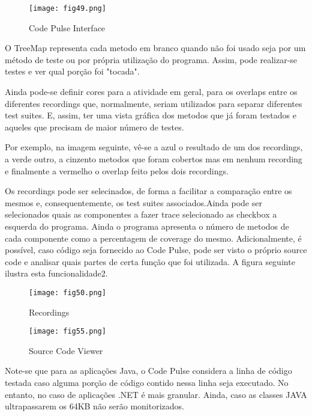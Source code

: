 \begin{figure}[H]

  \centering

  \texttt{[image: fig49.png]}

  \caption{Code Pulse Interface}

\end{figure}

O TreeMap representa cada metodo em branco quando não foi usado seja por um método de teste ou por própria utilização do programa. Assim, pode realizar-se testes e ver qual porção foi "tocada".

\par Ainda pode-se definir cores para a atividade em geral, para os overlaps entre os diferentes recordings que, normalmente, seriam utilizados para separar diferentes test suites. E, assim, ter uma vista gráfica dos metodos que já foram testados e aqueles que precisam de maior número de testes.
\par Por exemplo, na imagem seguinte, vê-se a azul o resultado de um dos recordings, a verde outro, a cinzento metodos que foram cobertos mas em nenhum recording e finalmente a vermelho o overlap feito pelos dois recordings.
\par Os recordings pode ser selecinados, de forma a facilitar a comparação entre os mesmos e, consequentemente, os test suites associados.Ainda pode ser selecionados quais as componentes a fazer trace selecionado as checkbox a esquerda do programa. Ainda o programa apresenta o número de metodos de cada componente como a percentagem de coverage do mesmo. Adicionalmente, é possível, caso código seja fornecido ao Code Pulse, pode ser visto o próprio source code e analisar quais partes de certa função que foi utilizada. A figura seguinte ilustra esta funcionalidade2.

\begin{figure}[!htb]

  \centering

  \texttt{[image: fig50.png]}

  \caption{Recordings}

\end{figure}


\begin{figure}[H]

  \centering

  \texttt{[image: fig55.png]}

  \caption{Source Code Viewer}

\end{figure}
\pagebreak
Note-se que para as aplicações Java, o Code Pulse considera a linha de código testada caso alguma porção de código contido nessa linha seja executado. No entanto, no caso de aplicações .NET é mais granular. Ainda, caso as classes JAVA ultrapassarem os 64KB não serão monitorizados.